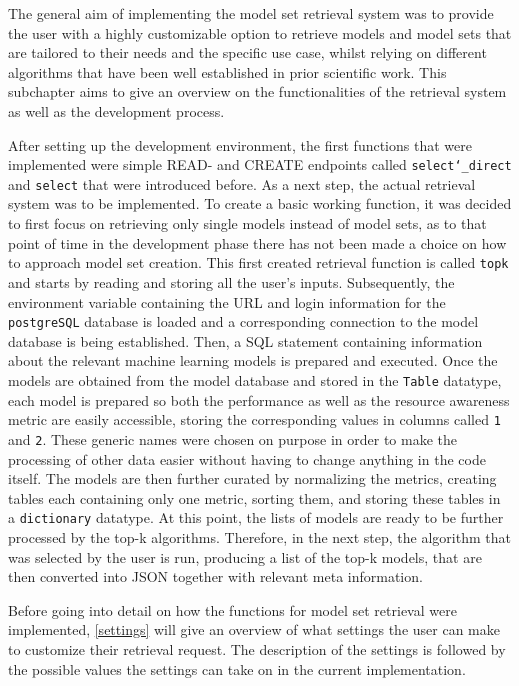 The general aim of implementing the model set retrieval system was to provide the user with a highly customizable option to retrieve models and model sets that are tailored to their needs and the specific use case, whilst relying on different algorithms that have been well established in prior scientific work. This subchapter aims to give an overview on the functionalities of the retrieval system as well as the development process.

After setting up the development environment, the first functions that were implemented were simple READ- and CREATE endpoints called \texttt{select\char`_direct} and \texttt{select} that were introduced before. As a next step, the actual retrieval system was to be implemented. To create a basic working function, it was decided to first focus on retrieving only single models instead of model sets, as to that point of time in the development phase there has not been made a choice on how to approach model set creation. This first created retrieval function is called \texttt{topk} and starts by reading and storing all the user’s inputs. Subsequently, the environment variable containing the URL and login information for the \texttt{postgreSQL} database is loaded and a corresponding connection to the model database is being established. Then, a SQL statement containing information about the relevant machine learning models is prepared and executed. Once the models are obtained from the model database and stored in the \texttt{Table} datatype, each model is prepared so both the performance as well as the resource awareness metric are easily accessible, storing the corresponding values in columns called \texttt{1} and \texttt{2}. These generic names were chosen on purpose in order to make the processing of other data easier without having to change anything in the code itself. The models are then further curated by normalizing the metrics, creating tables each containing only one metric, sorting them, and storing these tables in a \texttt{dictionary} datatype. At this point, the lists of models are ready to be further processed by the top-k algorithms. Therefore, in the next step, the algorithm that was selected by the user is run, producing a list of the top-k models, that are then converted into JSON together with relevant meta information.

Before going into detail on how the functions for model set retrieval were implemented, \autoref{settings} will give an overview of what settings the user can make to customize their retrieval request. The description of the settings is followed by the possible values the settings can take on in the current implementation. 


